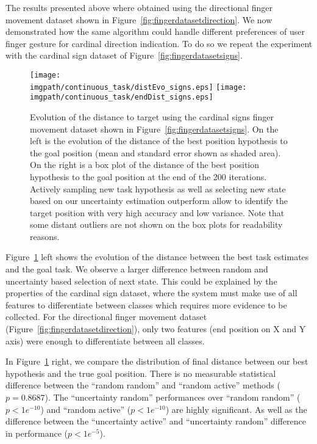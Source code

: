 The results presented above where obtained using the directional finger movement dataset shown in Figure~\ref{fig:fingerdatasetdirection}. We now demonstrated how the same algorithm could handle different preferences of user finger gesture for cardinal direction indication. To do so we repeat the experiment with the cardinal sign dataset of Figure~\ref{fig:fingerdatasetsigns}.

\begin{figure}[!htbp]
\centering
\texttt{[image: \\imgpath/continuous\_task/distEvo\_signs.eps]}
\texttt{[image: \\imgpath/continuous\_task/endDist\_signs.eps]}
\caption{Evolution of the distance to target using the cardinal signs finger movement dataset shown in Figure~\ref{fig:fingerdatasetsigns}. On the left is the evolution of the distance of the best position hypothesis to the goal position (mean and standard error shown as shaded area). On the right is a box plot of the distance of the best position hypothesis to the goal position at the end of the 200 iterations. Actively sampling new task hypothesis as well as selecting new state based on our uncertainty estimation outperform allow to identify the target position with very high accuracy and low variance. Note that some distant outliers are not shown on the box plots for readability reasons.}
\label{fig:continuoustaskdistevolution_signs}
\end{figure}

Figure~\ref{fig:continuoustaskdistevolution_signs} left shows the evolution of the distance between the best task estimates and the goal task. We observe a larger difference between random and uncertainty based selection of next state. This could be explained by the properties of the cardinal sign dataset, where the system must make use of all features to differentiate between classes which requires more evidence to be collected. For the directional finger movement dataset (Figure~\ref{fig:fingerdatasetdirection}), only two features (end position on X and Y axis) were enough to differentiate between all classes.

In Figure~\ref{fig:continuoustaskdistevolution_signs} right, we compare the distribution of final distance between our best hypothesis and the true goal position. There is no measurable statistical difference between the ``random random'' and ``random active'' methods ($p = 0.8687$). The ``uncertainty random'' performances over ``random random'' ($p<1e^{-10}$) and ``random active'' ($p<1e^{-10}$) are highly significant. As well as the difference between the ``uncertainty active'' and ``uncertainty random'' difference in performance ($p<1e^{-5}$).

